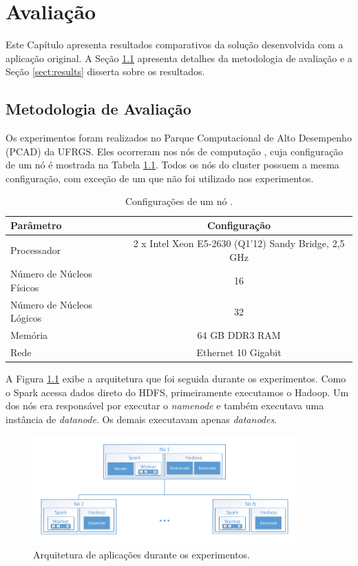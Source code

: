 \chapter{Avaliação} \label{ch:evaluation}

Este Capítulo apresenta resultados comparativos da solução desenvolvida com a 
aplicação original. A Seção \ref{sect:methodology} apresenta detalhes da 
metodologia de avaliação e a Seção \ref{sect:results} disserta sobre os 
resultados.


\section{Metodologia de Avaliação} \label{sect:methodology}

Os experimentos foram realizados no Parque Computacional de Alto Desempenho 
(PCAD) da UFRGS. Eles ocorreram nos nós de computação , cuja 
configuração de um nó é mostrada na Tabela \ref{tab:draco_config}. Todos os nós 
do cluster possuem a mesma configuração, com exceção de um que não foi utilizado 
nos experimentos.

\begin{table}[H]
\centering
\small
\begin{tabular}{l c} \toprule
\textbf{Parâmetro}  &  \textbf{Configuração} \\ 
\midrule
Processador     & 2 x Intel Xeon E5-2630 (Q1'12) Sandy Bridge, 2,5 GHz  
\\
Número de Núcleos Físicos    & 16  \\
Número de Núcleos Lógicos   & 32   \\
Memória       & 64 GB DDR3 RAM   \\
Rede	      & Ethernet 10 Gigabit \\
\end{tabular}
\caption{Configurações de um nó .}
\label{tab:draco_config}
\end{table}


A Figura \ref{fig:experiment_arch} exibe a arquitetura que foi seguida durante 
os experimentos. Como o Spark acessa dados direto do HDFS, primeiramente 
executamos o Hadoop. Um dos nós era responsável por executar o \textit{namenode} 
e também executava uma instância de \textit{datanode}. Os demais executavam 
apenas \textit{datanodes}.


\begin{figure}[ht]
\centerline{
\includegraphics[width=0.9\textwidth]{./img/experiments_arch.pdf}}
 \caption{Arquitetura de aplicações durante os experimentos.}
 \label{fig:experiment_arch}
\end{figure}


